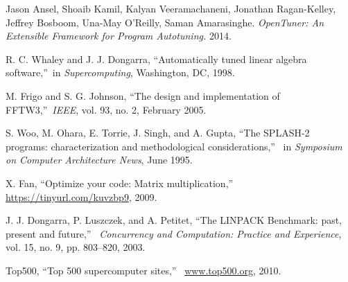 \documentclass[a4paper,11pt]{scrartcl}
\begin{document}
\begin{thebibliography}{9}
   
  
     Jason Ansel, Shoaib Kamil, Kalyan Veeramachaneni, Jonathan Ragan-Kelley, Jeffrey Bosboom, Una-May O'Reilly, Saman Amarasinghe. \emph{OpenTuner: An Extensible Framework for Program Autotuning.}
    2014.
   
 R. C. Whaley and J. J. Dongarra, \textquotedblleft Automatically tuned linear 
algebra software,\textquotedblright~in \emph{Supercomputing}, Washington, DC, 1998.

 M. Frigo and S. G. Johnson, \textquotedblleft The design and implementation of 
FFTW3,\textquotedblright~\emph{IEEE}, vol. 93, no. 2, February 2005.

 S. Woo, M. Ohara, E. Torrie, J. Singh, and A. Gupta, 
\textquotedblleft The SPLASH-2 programs:  characterization and methodological considerations,\textquotedblright
~in \emph{Symposium on Computer Architecture News}, June 1995.
    
  X. Fan, \textquotedblleft Optimize your code:  Matrix multiplication,\textquotedblright~
\url{https://tinyurl.com/kuvzbp9}, 2009.

 J. J. Dongarra, P. Luszczek, and A. Petitet, 
\textquotedblleft The LINPACK Benchmark:  past, present and future,\textquotedblright~
\emph{Concurrency and Computation:  Practice and Experience}, vol. 15, no. 9, pp. 803--820, 2003.

  Top500,
\textquotedblleft Top 500 supercomputer sites,\textquotedblright~
\url{www.top500.org}, 2010.

\end{thebibliography}
\end{document}
